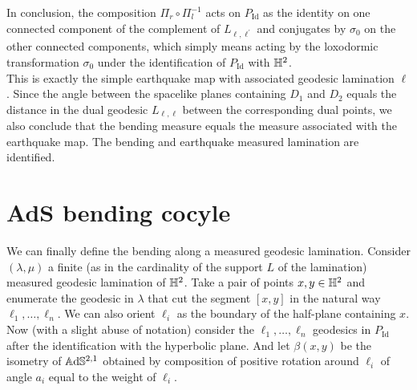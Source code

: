 In conclusion, the composition $\Pi_r\circ\Pi_l^{-1}$ acts on $P_{\text{Id}}$ as the identity on one connected component of the complement of $L_{\ell,\ell^{\prime}}$ and conjugates by $\sigma_0$ on the other connected components, which simply means acting by the loxodormic transformation $\sigma_0$ under the identification of $P_{\text{Id}}$ with $\mathbb{H}^2$.\\
This is exactly the simple earthquake map with associated geodesic lamination $\ell$. Since the angle between the spacelike planes containing $D_1$ and $D_2$ equals the distance in the dual geodesic $L_{\ell,\ell}$ between the corresponding dual points, we also conclude that the bending measure equals the measure associated with the earthquake map. The bending and earthquake measured lamination are identified. 

\section{AdS bending cocyle} 
We can finally define the bending along a measured geodesic lamination. Consider $(\lambda,\mu)$ a finite (as in the cardinality of the support $L$ of the lamination) measured geodesic lamination of $\mathbb{H}^2$. Take a pair of points $x,y\in \mathbb{H}^2$ and enumerate the geodesic in $\lambda$ that cut the segment $[x,y]$ in the natural way $\ell_1,\dots,\ell_n$. We can also orient $\ell_i$ as the boundary of the half-plane containing $x$. Now (with a slight abuse of notation) consider the $\ell_1,\dots,\ell_n$ geodesics in $P_{\text{Id}}$ after the identification with the hyperbolic plane. And let $\beta(x,y)$ be the isometry of $\mathbb{A}\mathrm{d}\mathbb{S}^{2,1}$ obtained by composition of positive rotation around $\ell_i$ of angle $a_i$ equal to the weight of $\ell_i$.  